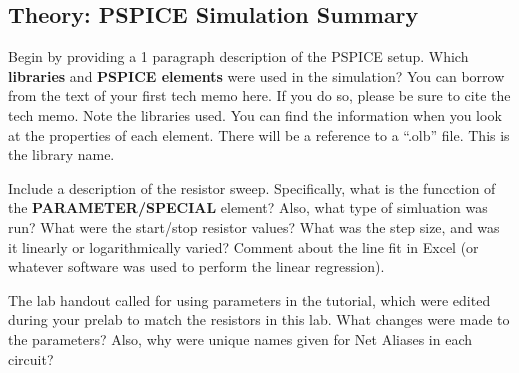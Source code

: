 \documentclass[11pt]{article}
\begin{document}



%
\subsection{Theory: PSPICE Simulation Summary}
Begin by providing a 1 paragraph description of the PSPICE setup.  Which \textbf{libraries} and \textbf{PSPICE elements} were used in the simulation? You can borrow from the text of your first tech memo here.  If you do so, please be sure to cite the tech memo. Note the libraries used. You can find the information when you look at the properties of each element.  There will be a reference to a ``.olb'' file.  This is the library name. 

Include a description of the resistor sweep.  Specifically, what is the funcction of the \textbf{PARAMETER/SPECIAL} element?   Also, what type of simluation was run? What were the start/stop resistor values? What was the step size, and was it linearly or logarithmically varied?    Comment about the line fit in Excel (or whatever software was used to perform the linear regression).

The lab handout called for using parameters in the tutorial, which were edited during your prelab to match the resistors in this lab.  What changes were made to the parameters?  Also, why were unique names given for Net Aliases in each circuit?
\end{document}
